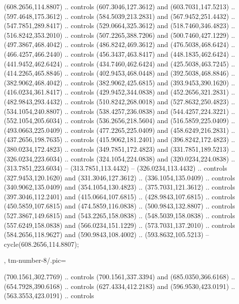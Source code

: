 {{\begin{scope}[y=-0.80pt,x=0.80pt,scale=0.04,yshift=232pt,xshift=-368pt]
       (608.2656,114.8807) .. controls
        (607.3046,127.3612) and (603.7031,147.5213) .. (597.4648,175.3612) .. controls
        (584.5039,213.2831) and (567.9452,251.4432) .. (547.7851,289.8417) .. controls
        (529.0664,325.3612) and (518.7460,346.4823) .. (516.8242,353.2010) .. controls
        (507.2265,388.7206) and (500.7460,427.1229) .. (497.3867,468.4042) .. controls
        (486.8242,469.3612) and (476.5038,468.6424) .. (466.4257,466.2440) .. controls
        (456.3437,463.8417) and (448.1835,462.6424) .. (441.9452,462.6424) .. controls
        (434.7460,462.6424) and (425.5038,463.7245) .. (414.2265,465.8846) .. controls
        (402.9453,468.0448) and (392.5038,468.8846) .. (382.9062,468.4042) .. controls
        (382.9062,425.6815) and (393.9453,390.1620) .. (416.0234,361.8417) .. controls
        (429.9452,344.0838) and (452.2656,321.2831) .. (482.9843,293.4432) .. controls
        (510.8242,268.0018) and (527.8632,250.4823) .. (534.1054,240.8807) .. controls
        (538.4257,236.0838) and (544.4257,224.3221) .. (552.1054,205.6034) .. controls
        (536.2656,218.5604) and (516.5859,225.0409) .. (493.0663,225.0409) .. controls
        (477.2265,225.0409) and (458.6249,216.2831) .. (437.2656,198.7635) .. controls
        (415.9062,181.2401) and (396.8242,172.4823) .. (380.0234,172.4823) .. controls
        (349.7851,172.4823) and (331.7851,189.5213) .. (326.0234,223.6034) .. controls
        (324.1054,224.0838) and (320.0234,224.0838) .. (313.7851,223.6034) --
        (313.7851,113.4432) -- (326.0234,113.4432) .. controls (327.9453,120.1620) and
        (331.3046,127.3612) .. (336.1054,135.0409) .. controls (340.9062,135.0409) and
        (354.1054,130.4823) .. (375.7031,121.3612) .. controls (397.3046,112.2401) and
        (415.0664,107.6815) .. (428.9843,107.6815) .. controls (450.5859,107.6815) and
        (474.5859,116.0838) .. (500.9843,132.8807) .. controls (527.3867,149.6815) and
        (543.2265,158.0838) .. (548.5039,158.0838) .. controls (557.6249,158.0838) and
        (566.0234,151.1229) .. (573.7031,137.2010) .. controls (584.2656,118.9627) and
        (590.9843,108.4002) .. (593.8632,105.5213) -- cycle(608.2656,114.8807);
    \end{scope}
  },
  tm-number-8/.pic={
    \begin{scope}[y=-0.80pt,x=0.80pt,scale=0.04,yshift=197pt,xshift=-450pt]
       (700.1561,302.7769) .. controls
      (700.1561,337.3394) and (685.0350,366.6168) .. (654.7928,390.6168) .. controls
      (627.4334,412.2183) and (596.9530,423.0191) .. (563.3553,423.0191) .. controls

\end{scope}}}
